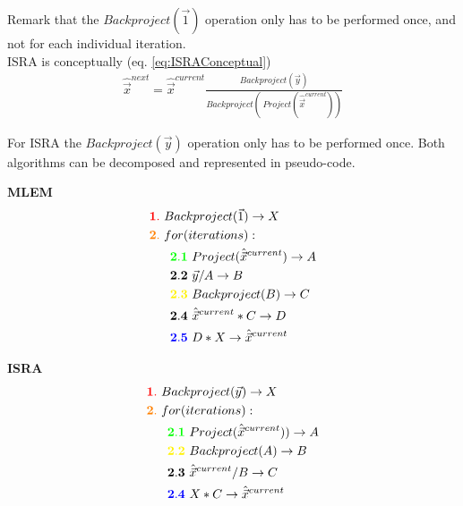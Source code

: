 \documentclass[report,12pt]{report}
\newlength\savedintextsep
\begin{document}
Remark that the $Backproject(\vec 1)$ operation only has to be performed once, and not for each individual iteration.\\

ISRA is conceptually (eq. \ref{eq:ISRAConceptual})
\begin{align}
	\hat{\vec{x}}^{next} = \hat{\vec{x}}^{current} \frac{Backproject(\vec y)}{Backproject(\ Project(\hat{\vec{x}}^{current}))}
\end{align}

For ISRA the $Backproject(\vec y)$ operation only has to be performed once. Both algorithms can be decomposed and represented in pseudo-code.\\
\setlength\intextsep{\savedintextsep}
        	\begin{minipage}[t]{.499\linewidth}
        	\centering
        	\textbf{MLEM}
        		\begin{align}
        			&\mathbf{ \begingroup\color{red}1.\endgroup}\ Backproject(\vec 1)\rightarrow X\nonumber\\
        			&\mathbf{\begingroup\color{orange}2.\endgroup}\ for(iterations):\nonumber\\
        			&\ \ \ \ \ \mathbf{\begingroup\color{green}2.1\endgroup}\ Project( \hat{\vec{x}}^{current}) \rightarrow A\nonumber\\
        			&\ \ \ \ \ \mathbf{\begingroup\color{black}2.2\endgroup}\ \vec{y} / A  \rightarrow B\nonumber\\
        			&\ \ \ \ \ \mathbf{\begingroup\color{yellow}2.3\endgroup}\ Backproject( B ) \rightarrow C\nonumber\\
        			&\ \ \ \ \ \mathbf{\begingroup\color{black}2.4\endgroup}\ \hat{\vec{x}}^{current} * C \rightarrow D\nonumber\\
        			&\ \ \ \ \ \mathbf{\begingroup\color{blue}2.5\endgroup}\ D * X \rightarrow \hat{\vec{x}}^{current}\nonumber
        		\end{align}
        	\end{minipage}
        	\begin{minipage}[t]{.499\linewidth}
        	\centering
        	\textbf{ISRA}
        		\begin{align}
        			&\mathbf{ \begingroup\color{red}1.\endgroup}\ Backproject(\vec y) \rightarrow X\nonumber\\
        			&\mathbf{ \begingroup\color{orange}2.\endgroup}\ for(iterations):\nonumber\\
        			&\ \ \ \ \ \mathbf{ \begingroup\color{green}2.1\endgroup}\ Project(\hat{\vec{x}}^{current})) \rightarrow A\nonumber\\
        			&\ \ \ \ \ \mathbf{ \begingroup\color{yellow}2.2\endgroup}\ Backproject(A)  \rightarrow B\nonumber\\
        			&\ \ \ \ \ \mathbf{ \begingroup\color{black}2.3\endgroup}\ \hat{\vec{x}}^{current} / B \rightarrow C\nonumber\\
        			&\ \ \ \ \ \mathbf{ \begingroup\color{blue}2.4\endgroup}\ X * C \rightarrow \hat{\vec{x}}^{current}\nonumber
        		\end{align}
        	\end{minipage}\\
\end{document}
